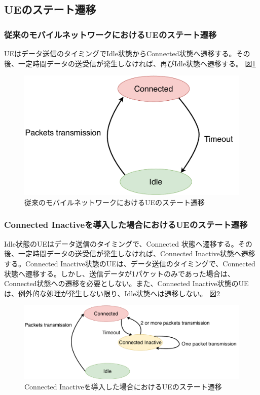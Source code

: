 \documentclass[a4j]{ujarticle}
\begin{document}
  \subsection{UEのステート遷移}
    \subsubsection{従来のモバイルネットワークにおけるUEのステート遷移}
    UEはデータ送信のタイミングでIdle状態からConnected状態へ遷移する。その後、一定時間データの送受信が発生しなければ、再びIdle状態へ遷移する。
    図\ref{state_change_old}
    \begin{figure}[htbp]
      \centering
      \includegraphics[width=0.7\hsize]{state_change_old.pdf}
      \caption{従来のモバイルネットワークにおけるUEのステート遷移}
      \label{state_change_old}
    \end{figure}
    \subsubsection{Connected Inactiveを導入した場合におけるUEのステート遷移}
    Idle状態のUEはデータ送信のタイミングで、Connected 状態へ遷移する。その後、一定時間データの送受信が発生しなければ、Connected Inactive状態へ遷移する。Connected Inactive状態のUEは、データ送信のタイミングで、Connected 状態へ遷移する。しかし、送信データが1パケットのみであった場合は、Connected状態への遷移を必要としない。また、Connected Inactive状態のUEは、例外的な処理が発生しない限り、Idle状態へは遷移しない。
    図\ref{state_change_inactive}
    \begin{figure}[htbp]
      \centering
      \includegraphics[width=1.0\hsize]{state_change_inactive.pdf}
      \caption{Connected Inactiveを導入した場合におけるUEのステート遷移}
      \label{state_change_inactive}
    \end{figure}
\end{document}
